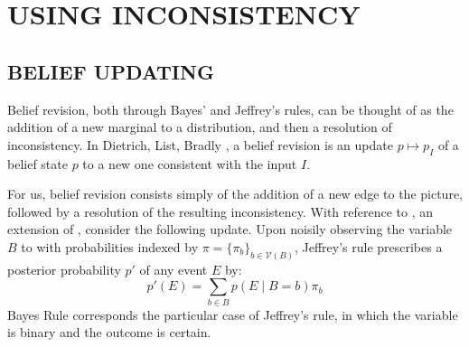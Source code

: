 \documentclass{article}
\theoremstyle{plain}
\newtheorem{coro}{Corollary}[theorem]
\newtheorem{conj}[theorem]{Conjecture}
\theoremstyle{definition}
\theoremstyle{remark}
\def\sheq{\!=\!}
\newcommand{\V}{\mathcal V}
\newcommand{\MN}{PDG}
\newcommand{\MNs}{\MN s}
\numberwithin{equation}{section}
\begin{document}

	

	\section{USING INCONSISTENCY}	
	\subsection{BELIEF UPDATING} \label{sec:belief-update}
	Belief revision, both through Bayes' and Jeffrey's rules, can be thought of as the addition of a new marginal to a distribution, and then a resolution of inconsistency. In Dietrich, List, Bradly \cite{dietrich2016belief}, a belief revision is an update $p \mapsto p_I$ of a belief state $p$ to a new one consistent with the input $I$. 
	
	For us, belief revision consists simply of the addition of a new edge to the picture, followed by a resolution of the resulting inconsistency. 
	With reference to , an extension of , consider the following update. 
	Upon noisily observing the variable $B$ to with probabilities indexed by $\pi = \{\pi_b\}_{b \in \V(B)}$, Jeffrey's rule prescribes a posterior probability $p'$ of any event $E$ by:
	\[ p'(E) = \sum_{b \in B} p(E \mid B\sheq b) \pi_b \]
	Bayes Rule corresponds the particular case of Jeffrey's rule, in which the variable is binary and the outcome is certain.
\end{document}
